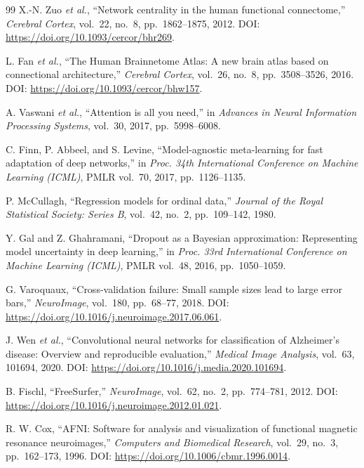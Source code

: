 \documentclass{ssnreview}
\begin{document}
\begin{thebibliography}{99}
 X.-N. Zuo \textit{et al.}, ``Network centrality in the human functional connectome,'' \textit{Cerebral Cortex}, vol.~22, no.~8, pp.~1862--1875, 2012. DOI: \url{https://doi.org/10.1093/cercor/bhr269}.


 L. Fan \textit{et al.}, ``The Human Brainnetome Atlas: A new brain atlas based on connectional architecture,'' \textit{Cerebral Cortex}, vol.~26, no.~8, pp.~3508--3526, 2016. DOI: \url{https://doi.org/10.1093/cercor/bhw157}.

 A. Vaswani \textit{et al.}, ``Attention is all you need,'' in \textit{Advances in Neural Information Processing Systems}, vol.~30, 2017, pp.~5998--6008.

 C. Finn, P. Abbeel, and S. Levine, ``Model-agnostic meta-learning for fast adaptation of deep networks,'' in \textit{Proc. 34th International Conference on Machine Learning (ICML)}, PMLR vol.~70, 2017, pp.~1126--1135.

 P. McCullagh, ``Regression models for ordinal data,'' \textit{Journal of the Royal Statistical Society: Series B}, vol.~42, no.~2, pp.~109--142, 1980.

 Y. Gal and Z. Ghahramani, ``Dropout as a Bayesian approximation: Representing model uncertainty in deep learning,'' in \textit{Proc. 33rd International Conference on Machine Learning (ICML)}, PMLR vol.~48, 2016, pp.~1050--1059.

 G. Varoquaux, ``Cross-validation failure: Small sample sizes lead to large error bars,'' \textit{NeuroImage}, vol.~180, pp.~68--77, 2018. DOI: \url{https://doi.org/10.1016/j.neuroimage.2017.06.061}.

 J. Wen \textit{et al.}, ``Convolutional neural networks for classification of Alzheimer's disease: Overview and reproducible evaluation,'' \textit{Medical Image Analysis}, vol.~63, 101694, 2020. DOI: \url{https://doi.org/10.1016/j.media.2020.101694}.

 B. Fischl, ``FreeSurfer,'' \textit{NeuroImage}, vol.~62, no.~2, pp.~774--781, 2012. DOI: \url{https://doi.org/10.1016/j.neuroimage.2012.01.021}.

 R. W. Cox, ``AFNI: Software for analysis and visualization of functional magnetic resonance neuroimages,'' \textit{Computers and Biomedical Research}, vol.~29, no.~3, pp.~162--173, 1996. DOI: \url{https://doi.org/10.1006/cbmr.1996.0014}.


\end{thebibliography}
\end{document}
